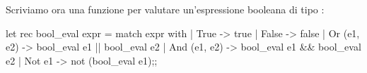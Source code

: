 Scriviamo ora una funzione per valutare un'espressione booleana di tipo :
\begin{OCaml}
    let rec bool_eval expr =
        match expr with
        | True         -> true
        | False        -> false
        | Or (e1, e2)  -> bool_eval e1 || bool_eval e2
        | And (e1, e2) -> bool_eval e1 && bool_eval e2
        | Not e1       -> not (bool_eval e1);;
\end{OCaml}